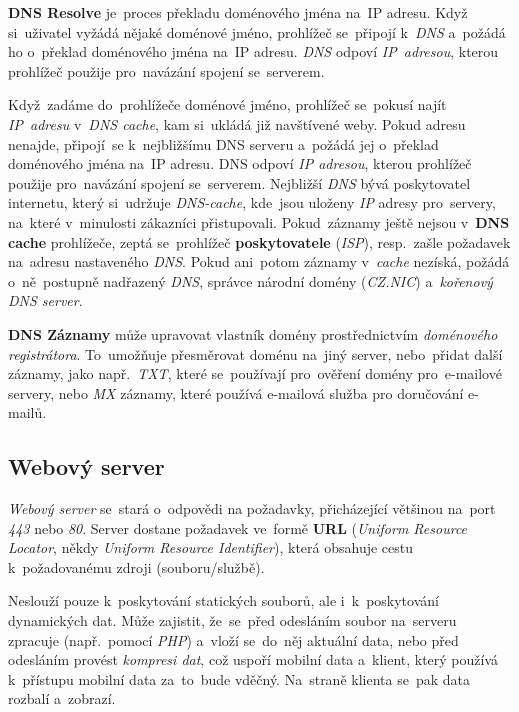 \documentclass[10pt,a4paper]{article}
\begin{document}
            \textbf{DNS Resolve} je~proces překladu doménového jména na~IP adresu. Když si~uživatel vyžádá nějaké doménové jméno, prohlížeč se~připojí k~\emph{DNS} a~požádá ho o~překlad doménového jména na~IP adresu. \emph{DNS} odpoví \emph{IP~adresou}, kterou prohlížeč použije pro~navázání spojení se~serverem.

            Když~zadáme do~prohlížeče doménové jméno, prohlížeč se~pokusí najít \emph{IP~adresu} v~\emph{DNS cache}, kam si~ukládá již navštívené weby. Pokud adresu nenajde, připojí~se k~nejbližšímu DNS serveru a~požádá jej o~překlad doménového jména na~IP adresu. DNS odpoví \emph{IP adresou}, kterou prohlížeč použije pro~navázání spojení se~serverem. Nejbližší \emph{DNS} bývá poskytovatel internetu, který si~udržuje \emph{DNS-cache}, kde~jsou uloženy \emph{IP} adresy pro~servery, na~které v~minulosti zákazníci přistupovali. Pokud~záznamy ještě nejsou v~\textbf{DNS cache} prohlížeče, zeptá se~prohlížeč \textbf{poskytovatele} (\emph{ISP}), resp.~zašle požadavek na~adresu nastaveného \emph{DNS}. Pokud ani~potom záznamy v~\emph{cache} nezíská, požádá o~ně~postupně nadřazený \emph{DNS}, správce národní domény (\emph{CZ.NIC}) a~\emph{kořenový DNS server}.

            \textbf{DNS Záznamy} může upravovat vlastník domény prostřednictvím \emph{doménového registrátora}. To~umožňuje přesměrovat doménu na~jiný server, nebo~přidat další záznamy, jako např.~\emph{TXT}, které se~používají pro~ověření domény pro~e-mailové servery, nebo \emph{MX} záznamy, které používá e-mailová služba pro doručování e-mailů.\cite{dns:mdn}

        \subsection{Webový server}
            \emph{Webový server} se~stará o~odpovědi na požadavky, přicházející většinou na~port \emph{443} nebo \emph{80}. Server dostane požadavek ve~formě \textbf{URL} (\emph{Uniform Resource Locator}, někdy \emph{Uniform Resource Identifier}), která obsahuje cestu k~požadovanému zdroji (souboru/službě).

            Neslouží pouze k~poskytování statických souborů, ale i~k~poskytování dynamických dat. Může zajistit, že~se~před odesláním soubor na~serveru zpracuje (např.~pomocí \emph{PHP}) a~vloží se~do~něj aktuální data, nebo před odesláním provést \emph{kompresi dat}, což uspoří mobilní data a~klient, který používá k~přístupu mobilní data za~to~bude vděčný. Na~straně klienta se~pak data rozbalí a~zobrazí.
\end{document}
